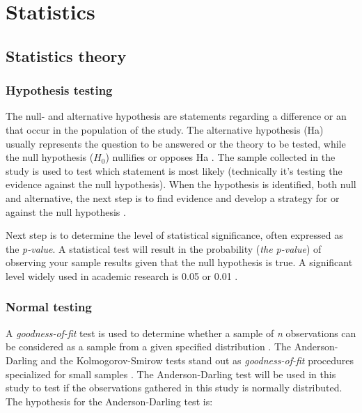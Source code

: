 \chapter{Statistics}


\section{Statistics theory}

\subsection{Hypothesis testing}
The null- and alternative hypothesis are statements regarding a difference or an that occur in the population of the study. The alternative hypothesis (Ha) usually represents the question to be answered or the theory to be tested, while the null hypothesis ($H_{0}$) nullifies or opposes Ha \citep{Walpole2012}. The sample collected in the study is used to test which statement is most likely (technically it's testing the evidence against the null hypothesis).  When the hypothesis is identified, both null and alternative, the next step is to find evidence and develop a strategy for or against the null hypothesis \citep{LundResearchLtd2013}.

Next step is to determine the level of statistical significance, often expressed as the \textit{p-value}. A statistical test will result in the probability (\textit{the p-value}) of observing your sample results given that the null hypothesis is true. A significant level widely used in academic research is 0.05 or 0.01 \citep{Walpole2012}. 


\subsection{Normal testing}\label{subsec:normaltesting}
A \textit{goodness-of-fit} test is used to determine whether a sample of \textit{n} observations can be considered as a sample from a given specified distribution \citep{Walpole2012}. The Anderson-Darling and the Kolmogorov-Smirow tests stand out as \textit{goodness-of-fit} procedures specialized for small samples \citep{Romeu2003}. The Anderson-Darling test will be used in this study to test if the observations gathered in this study is normally distributed.  %
The hypothesis for the Anderson-Darling test is: \newline

